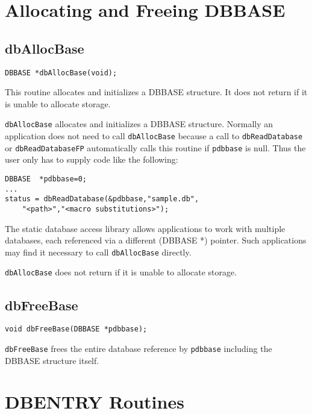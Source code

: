 \section{Allocating and Freeing DBBASE}

\subsection{dbAllocBase}

\begin{verbatim}
DBBASE *dbAllocBase(void);
\end{verbatim}

This routine allocates and initializes a DBBASE structure. It does not return if it is unable to allocate storage.

\verb|dbAllocBase| allocates and initializes a DBBASE structure. Normally an application does not need to call 
\verb|dbAllocBase| because a call to \verb|dbReadDatabase| or \verb|dbReadDatabaseFP| automatically calls this routine if 
\verb|pdbbase| is null. Thus the user only has to supply code like the following:

\begin{verbatim}
DBBASE  *pdbbase=0;
...
status = dbReadDatabase(&pdbbase,"sample.db",
    "<path>","<macro substitutions>");
\end{verbatim}

The static database access library allows applications to work with multiple databases, each referenced via a different 
(DBBASE *) pointer. Such applications may find it necessary to call \verb|dbAllocBase| directly.

\verb|dbAllocBase| does not return if it is unable to allocate storage.

\subsection{dbFreeBase}

\begin{verbatim}
void dbFreeBase(DBBASE *pdbbase);
\end{verbatim}

\verb|dbFreeBase| frees the entire database reference by \verb|pdbbase| including the DBBASE structure itself.

\section{DBENTRY Routines}

